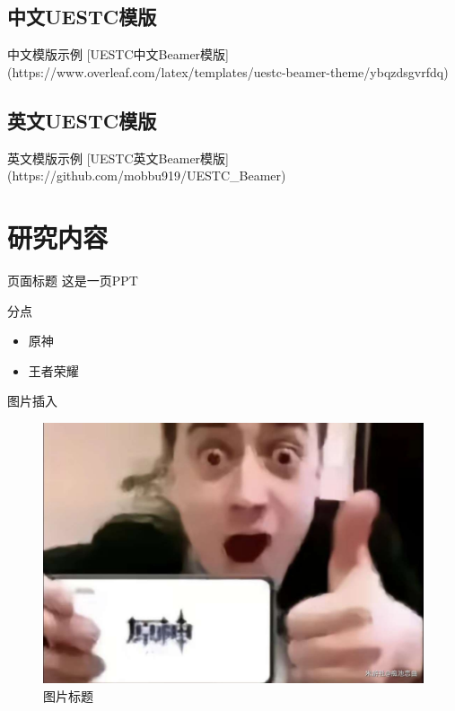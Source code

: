 \subsection{中文UESTC模版}

\begin{frame}{中文模版示例}
[UESTC中文Beamer模版](https://www.overleaf.com/latex/templates/uestc-beamer-theme/ybqzdsgvrfdq)
\end{frame}

\subsection{英文UESTC模版}
\begin{frame}{英文模版示例}
[UESTC英文Beamer模版](https://github.com/mobbu919/UESTC_Beamer)
\end{frame}

\section{研究内容}

\begin{frame}{页面标题}
这是一页PPT
\end{frame}

\begin{frame}{分点}
\begin{itemize}
    \item 原神
    \item 王者荣耀
\end{itemize}
\end{frame}

\begin{frame}{图片插入}

\begin{figure}
    \centering 
    \includegraphics[width=0.75\linewidth]{pic/test.pdf} 
    \caption{图片标题}
\end{figure}

\end{frame}

